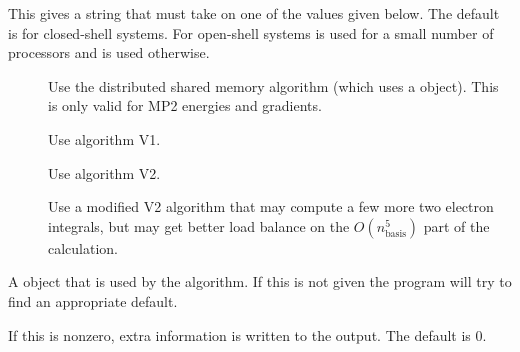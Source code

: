 \begin{description}
\begin{description}
     \end{description}

  \item[\keywd{algorithm}] This gives a string that must take on one of the
     values given below.  The default is  for closed-shell
     systems.  For open-shell systems  is used for a small number
     of processors and  is used otherwise.

     \begin{description}

        \item[] Use the distributed shared memory algorithm
          (which uses a  object).  This is only valid
          for MP2 energies and gradients.

        \item[] Use algorithm V1.

        \item[] Use algorithm V2.

        \item[] Use a modified V2 algorithm that may compute a
           few more two electron integrals, but may get better load balance
           on the $O(n_\mathrm{basis}^5)$ part of the calculation.

     \end{description}

  \item[\keywd{memorygrp}] A  object that is used by
     the  algorithm.  If this is not given the program will
     try to find an appropriate default.

  \item[\keywd{debug}] If this is nonzero, extra information is written to
     the output.  The default is 0.

\end{description}

